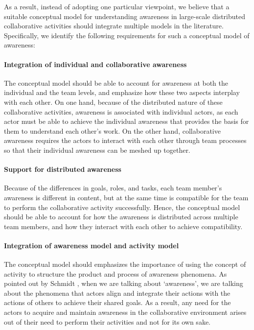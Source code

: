 As a result, instead of adopting one particular viewpoint, we believe that a suitable conceptual model for understanding awareness in large-scale distributed collaborative activities should integrate multiple models in the literature. Specifically, we identify the following requirements for such a conceptual model of awareness:

\paragraph*{Integration of individual and collaborative awareness} %
\label{par:the_integration_of_individual_and_collaborative_awareness}
The conceptual model should be able to account for awareness at both the individual and the team levels, and emphasize how these two aspects interplay with each other. On one hand, because of the distributed nature of these collaborative activities, awareness is associated with individual actors, as each actor must be able to achieve the individual awareness that provides the basis for them to understand each other's work. On the other hand, collaborative awareness requires the actors to interact with each other through team processes so that their individual awareness can be meshed up together.

\paragraph*{Support for distributed awareness} %
\label{par:the_distributed_nature_of_awareness}
Because of the differences in goals, roles, and tasks, each team member's awareness is different in content, but at the same time is compatible for the team to perform the collaborative activity successfully. Hence, the conceptual model should be able to account for how the awareness is distributed across multiple team members, and how they interact with each other to achieve compatibility. 

\paragraph*{Integration of awareness model and activity model} %
\label{par:the_coupling_between_awareness_and_activity}
The conceptual model should emphasizes the importance of using the concept of activity to structure the product and process of awareness phenomena. As pointed out by Schmidt \cite{schmidt2002a}, when we are talking about `awareness', we are talking about the phenomena that actors align and integrate their actions with the actions of others to achieve their shared goals. As a result, any need for the actors to acquire and maintain awareness in the collaborative environment arises out of their need to perform their activities and not for its own sake.

